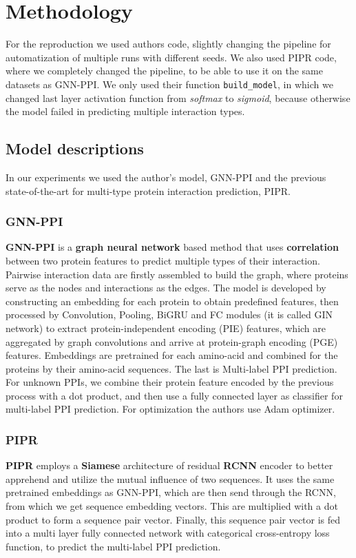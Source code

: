 \section{Methodology}
For the reproduction we used authors code, slightly changing the pipeline for automatization of multiple runs with different seeds. We also used PIPR code, where we completely changed the pipeline, to be able to use it on the same datasets as GNN-PPI. We only used their function \texttt{build\_model}, in which we changed last layer activation function from \emph{softmax} to \emph{sigmoid}, because otherwise the model failed in predicting multiple interaction types.

\subsection{Model descriptions}
In our experiments we used the author's model, GNN-PPI and the previous state-of-the-art for multi-type protein interaction prediction, PIPR.

\subsubsection{GNN-PPI}
\textbf{GNN-PPI} is a \textbf{graph neural network} based method that uses \textbf{correlation} between two protein features to predict multiple types of their interaction. 
Pairwise interaction data are firstly assembled to build the graph, where proteins serve as the nodes and interactions as the edges. 
The model is developed by constructing an embedding for each protein to obtain predefined features,
then processed by Convolution, Pooling, BiGRU and FC modules (it is called GIN network) to extract protein-independent encoding (PIE) features, which are aggregated by graph convolutions and arrive at protein-graph encoding (PGE) features. Embeddings are pretrained for each amino-acid and combined for the proteins by their amino-acid sequences.
The last is Multi-label PPI prediction. For unknown PPIs, we combine their protein feature encoded by the previous process with a dot product, and then use a fully connected layer as classifier for multi-label PPI prediction. For optimization the authors use Adam optimizer.

\subsubsection{PIPR}
\textbf{PIPR} employs a \textbf{Siamese }architecture of residual \textbf{RCNN} encoder to better apprehend and utilize the mutual influence of two sequences. It uses the same pretrained embeddings as GNN-PPI, which are then send through the RCNN, from which we get sequence embedding vectors. This are multiplied with a dot product to form a sequence pair vector.
Finally, this sequence pair vector is fed into a multi layer fully connected network with categorical cross-entropy loss function, to predict the multi-label PPI prediction.

